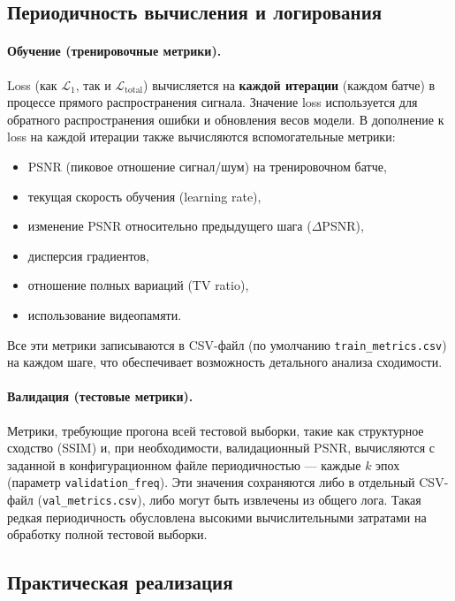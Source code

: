 \documentclass[12pt,a4paper]{article}
\begin{document}
\subsection{Периодичность вычисления и логирования}

\paragraph{Обучение (тренировочные метрики).}
Loss (как \(\mathcal{L}_1\), так и \(\mathcal{L}_{\text{total}}\)) вычисляется на \textbf{каждой итерации} (каждом батче) в процессе прямого распространения сигнала. Значение loss используется для обратного распространения ошибки и обновления весов модели. В дополнение к loss на каждой итерации также вычисляются вспомогательные метрики:
\begin{itemize}
    \item PSNR (пиковое отношение сигнал/шум) на тренировочном батче,
    \item текущая скорость обучения (learning rate),
    \item изменение PSNR относительно предыдущего шага (\(\Delta\)PSNR),
    \item дисперсия градиентов,
    \item отношение полных вариаций (TV ratio),
    \item использование видеопамяти.
\end{itemize}
Все эти метрики записываются в CSV-файл (по умолчанию \texttt{train\_metrics.csv}) на каждом шаге, что обеспечивает возможность детального анализа сходимости.

\paragraph{Валидация (тестовые метрики).}
Метрики, требующие прогона всей тестовой выборки, такие как структурное сходство (SSIM) и, при необходимости, валидационный PSNR, вычисляются с заданной в конфигурационном файле периодичностью — каждые \(k\) эпох (параметр \texttt{validation\_freq}). Эти значения сохраняются либо в отдельный CSV-файл (\texttt{val\_metrics.csv}), либо могут быть извлечены из общего лога. Такая редкая периодичность обусловлена высокими вычислительными затратами на обработку полной тестовой выборки.

\subsection{Практическая реализация}
\end{document}
